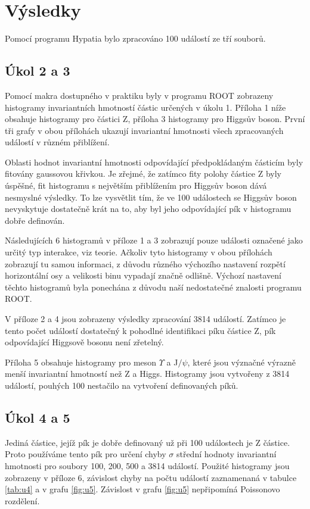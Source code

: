\documentclass{protokol}
\begin{document}
  \section*{Výsledky}

    Pomocí programu Hypatia bylo zpracováno 100 událostí ze tří souborů. 

    \subsection*{Úkol 2 a 3}

      Pomocí makra dostupného v praktiku byly v programu ROOT zobrazeny histogramy invariantních hmotností částic určených v úkolu 1. Příloha 1 níže obsahuje histogramy pro částici Z, příloha 3 histogramy pro Higgsův boson. První tři grafy v obou přílohách ukazují invariantní hmotnosti všech zpracovaných událostí v různém přiblížení. 
      
      Oblasti hodnot invariantní hmotnosti odpovídající předpokládaným částicím byly fitovány gaussovou křivkou. Je zřejmé, že zatímco fity polohy částice Z byly úspěšné, fit histogramu s největším přiblížením pro Higgsův boson dává nesmyslné výsledky. To lze vysvětlit tím, že ve 100 událostech se Higgsův boson nevyskytuje dostatečně krát na to, aby byl jeho odpovídající pík v histogramu dobře definován.

      Následujících 6 histogramů v příloze 1 a 3 zobrazují pouze události označené jako určitý typ interakce, viz teorie. Ačkoliv tyto histogramy v obou přílohách zobrazují tu samou informaci, z důvodu různého výchozího nastavení rozpětí horizontální osy a velikosti binu vypadají značně odlišně. Výchozí nastavení těchto histogramů byla ponechána z důvodu naší nedostatečné znalosti programu ROOT.

      V příloze 2 a 4 jsou zobrazeny výsledky zpracování 3814 událostí. Zatímco je tento počet událostí dostatečný k pohodlné identifikaci píku částice Z, pík odpovídající Higgsově bosonu není zřetelný.

      Příloha 5 obsahuje histogramy pro meson $\Upsilon$ a J$/\psi$, které jsou význačné výrazně menší invariantní hmotností než Z a Higgs. Histogramy jsou vytvořeny z 3814 událostí, pouhých 100 nestačilo na vytvoření definovaných píků.

    \subsection*{Úkol 4 a 5}

      Jediná částice, jejíž pík je dobře definovaný už při 100 událostech je Z částice. Proto používáme tento pík pro určení chyby $\sigma$ střední hodnoty invariantní hmotnosti pro soubory 100, 200, 500 a 3814 událostí. Použité histogramy jsou zobrazeny v příloze 6, závislost chyby na počtu událostí zaznamenaná v tabulce \ref{tab:u4} a v grafu \ref{fig:u5}. Závislost v grafu \ref{fig:u5} nepřipomíná Poissonovo rozdělení.
\end{document}
